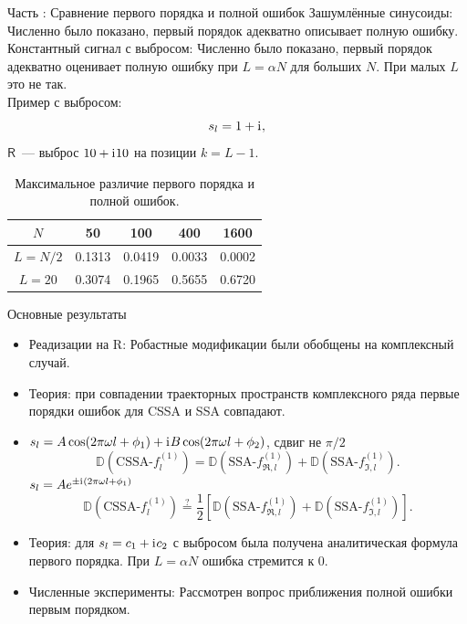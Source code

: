 \documentclass[10pt, ucs, notheorems, handout]{beamer}
\newcommand{\tX}[1]{\mathsf{#1}}
\newcommand{\iu}{\mathrm{i}\mkern1mu}
\newcommand{\RomanNumeralCaps}[1]
{\MakeUppercase{\romannumeral #1}}
\begin{document}
\begin{frame}{Часть \RomanNumeralCaps{2}: Сравнение первого порядка и полной ошибок}
\alert{Зашумлённые синусоиды:} Численно было показано, первый порядок адекватно описывает полную ошибку.\\
\vspace{1em}
\alert{Константный сигнал с выбросом:} Численно было показано, первый порядок адекватно оценивает полную ошибку при $L = \alpha N$ для больших $N$. При малых $L$ это не так.\\
\vspace{1em}
\alert{Пример с выбросом:}
$$s_l = 1 + \iu,$$
$\tX{R}$~--- выброс $10 + \iu 10$ на позиции $k = L - 1$.

\begin{table}[H]
	\begin{center}
		\caption{Максимальное различие первого порядка и полной ошибок.}
		\label{tab:const_outl}
		\begin{tabular}{|c|c|c|c|c|}
			\hline
			$N$	& 50 & 100 & 400 & 1600 \\
			\hline
			$L = N / 2$ & 0.1313  & 0.0419  & 0.0033 & 0.0002 \\
			\hline
			$L = 20$ & 0.3074  & 0.1965  & 0.5655 & 0.6720 \\
			\hline
		\end{tabular}
	\end{center}
\end{table}

\end{frame}


\begin{frame}{Основные результаты}
    \begin{itemize}
    	\item \alert{Реадизации на R:} Робастные модификации были обобщены на комплексный случай. 
        \item \alert{Теория:} при совпадении траекторных пространств комплексного ряда первые порядки ошибок для CSSA и SSA совпадают.
        \item $s_l = A\cos(2 \pi\omega l + \phi_1) + \iu B\cos(2 \pi\omega l + \phi_2)$, сдвиг не $\pi / 2$
        $$\mathbb{D}(\text{CSSA-}f^{(1)}_l) = \mathbb{D}(\text{SSA-}f^{(1)}_{\Re, l}) + \mathbb{D}(\text{SSA-}f^{(1)}_{\Im, l}).$$
        $s_l = Ae^{\pm \iu(2 \pi\omega l + \phi_1)}$
        $$\mathbb{D}(\text{CSSA-}f^{(1)}_l) \stackrel{?}{=} \frac{1}{2}[\mathbb{D}(\text{SSA-}f^{(1)}_{\Re, l}) + \mathbb{D}(\text{SSA-}f^{(1)}_{\Im, l})].$$
        \item \alert{Теория:} для $s_l = c_1 + \iu c_2$ с выбросом была получена аналитическая формула первого порядка. При $L = \alpha N$ ошибка стремится к $0$.
        \item \alert{Численные эксперименты:} Рассмотрен вопрос приближения полной ошибки первым порядком.
    \end{itemize}
\end{frame}
\end{document}
